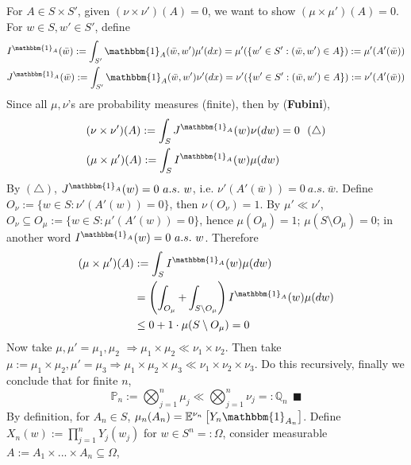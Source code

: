 \documentclass[a4paper,12pt,twoside]{book}
\begin{document}
\begin{itemize}
\begin{itemize}
	For $A\in S\times S'$, given $(\nu \times \nu')(A)=0$, we want to show $(\mu \times \mu')(A)=0$. For $w\in S, w'\in S'$, define
	\begin{equation}
		\begin{split}
			&I^{\mathbbm{1}_{A}}(\bar{w}):=\int_{S'} \mathbbm{1}_{A}(\bar{w}, w')\mu'(dx)=\mu'(\{w'\in S': (\bar{w}, w')\in A\}):=\mu'(A'(\bar{w}))\\
			&J^{\mathbbm{1}_{A}}(\bar{w}):=\int_{S'} \mathbbm{1}_{A}(\bar{w}, w')\nu'(dx)=\nu'(\{w'\in S': (\bar{w}, w')\in A\}):=\nu'(A'(\bar{w}))
		\end{split}
	\end{equation}
	Since all $\mu,\nu$'s are probability measures (finite), then by (\textbf{Fubini}),
	\begin{equation}
		\begin{split}
			&(\nu \times \nu')(A) := \int_{S} J^{\mathbbm{1}_{A}}(w) \nu(dw)=0~~(\triangle)\\
			&(\mu \times \mu')(A) := \int_{S} I^{\mathbbm{1}_{A}}(w) \mu(dw)
		\end{split}
	\end{equation}
	By $(\triangle)$, $J^{\mathbbm{1}_{A}}(w)=0~a.s.~w$, i.e. $\nu'(A'(\bar{w}))=0~a.s.~\bar{w}$. Define $O_{\nu}:=\{w\in S: \nu'(A'(w))=0\}$, then $\nu\left(O_{\nu}\right)=1$. \newline
	By $\mu' \ll \nu'$, $O_{\nu} \subseteq O_{\mu}:=\{w\in S: \mu'(A'(w))=0\}$, hence $\mu\left(O_{\mu}\right)=1$; $\mu\left(S\setminus O_{\mu}\right)=0$; in another word $I^{\mathbbm{1}_{A}}(w)=0~a.s.~w$. Therefore
	\begin{equation}
		\begin{split}
			(\mu \times \mu')(A) &:= \int_{S} I^{\mathbbm{1}_{A}}(w) \mu(dw)\\
			&=\left(\int_{O_{\mu}}+\int_{S \setminus O_{\mu}}\right) I^{\mathbbm{1}_{A}}(w) \mu(dw)\\
			&\leq 0+1\cdot \mu(S\setminus O_{\mu})=0
		\end{split}
	\end{equation}
	Now take $\mu,\mu'=\mu_1,\mu_2$ $\Rightarrow \mu_1\times \mu_2 \ll \nu_1 \times \nu_2$. \newline
	Then take $\mu :=\mu_1\times \mu_2, \mu' = \mu_3 \Rightarrow \mu_1\times \mu_2 \times \mu_3 \ll \nu_1 \times \nu_2 \times \nu_3$. Do this recursively, finally we conclude that for finite $n$,
	\begin{equation}
		\mathbb{P}_n:=\bigotimes_{j= 1}^n \mu_j \ll \bigotimes_{j= 1}^n \nu_j=: \mathbb{Q}_n ~~\blacksquare
	\end{equation}
	By definition, for $A_n \in S$, $\mu_n(A_n)=\mathbb{E}^{\nu_n}\left[Y_n \mathbbm{1}_{A_n}\right]$. Define $X_n(w):=\prod_{j=1}^n Y_j (w_j)$ for $w\in S^n=:\Omega$, consider measurable $A:=A_1 \times ... \times A_n \subseteq \Omega$, 


\end{itemize}
\end{itemize}
\end{document}
